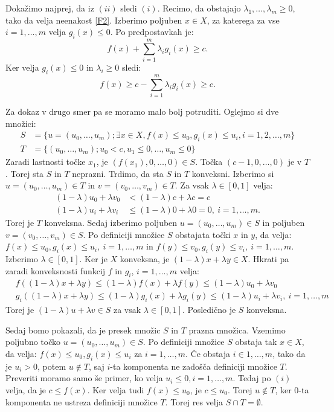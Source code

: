 \documentclass[mat1]{fmfdelo}
\begin{document}
\begin{dokaz}
	Dokažimo najprej, da iz $(ii)$ sledi $(i).$ Recimo, da obstajajo $\lambda_1, \ldots, \lambda_m \ge 0$, tako da velja neenakost \eqref{F2}. Izberimo poljuben $x \in X$, za katerega za vse $i = 1,\ldots, m$ velja $g_i(x) \le 0$. Po predpostavkah je: 
	$$ f(x) + \sum_{i=1}^{m}\lambda_ig_i(x) \ge c.$$ 
	Ker velja $g_i(x) \le 0$ in $\lambda_i \ge 0$ sledi: 
	$$ f(x) \ge c  - \sum_{i=1}^{m}\lambda_ig_i(x)\ge c. $$
	
	
	Za dokaz v drugo smer pa se moramo malo bolj potruditi.
	Oglejmo si dve množici: 
	\begin{align*}
	S &= \{u = (u_0,\ldots, u_m); \exists x \in X, f(x) \le u_0, g_i(x) \le u_i, i = 1,2, \ldots, m				\}\\ 
	T &= \{(u_0,\ldots, u_m); u_0 < c, u_1 \le 0, \ldots, u_m\le 0				\}     
	\end{align*}
	Zaradi lastnosti točke $x_1$, je $(f(x_1), 0, \ldots, 0) \in S$. Točka $(c-1, 0,\ldots ,0)$ je v $T$. Torej sta $S$ in $T$ neprazni. 
	Trdimo, da sta $S$ in $T$ konveksni. Izberimo si $u = (u_0, \ldots, u_m) \in T$ in $v = (v_0,  \ldots, v_m) \in T.$ Za vsak $\lambda \in [0,1]$ velja:
	\begin{align*}
	(1-\lambda)u_0 + \lambda v_0 &< 	(1-\lambda)c + \lambda c = c \\
	(1-\lambda)u_i + \lambda v_i &\le 	(1-\lambda)0 + \lambda 0 = 0, ~ i = 1, \ldots, m.
	\end{align*}
	Torej je $T$ konveksna. Sedaj izberimo poljuben $u = (u_0, \ldots, u_m) \in S$ in poljuben $v = (v_0,  \ldots, v_m) \in S.$ Po definiciji množice $S$ obstajata točki $x$ in $y$, da velja: $f(x) \le u_0, g_i(x) \le u_i, ~ i=1, \ldots, m$ in $f(y) \le v_0, g_i(y) \le v_i, ~ i=1, \ldots, m$. Izberimo $\lambda \in [0,1]$. Ker je $X$ konveksna, je $(1-\lambda)x + \lambda y \in X.$ Hkrati pa zaradi konveksnosti funkcij $f$ in $g_i$, $i=1,\ldots, m$ velja:
	\begin{align*}
	&f((1-\lambda)x + \lambda y) \le (1-\lambda)f(x) + \lambda f(y) \le 	 (1-\lambda)u_0 + \lambda v_0	\\
	&g_i((1-\lambda)x + \lambda y) \le (1-\lambda)g_i(x) + \lambda g_i(y) \le 	 (1-\lambda)u_i + \lambda v_i, ~i=1,\ldots,m	
	\end{align*}
	Torej je $(1-\lambda)u + \lambda v \in S$ za vsak $\lambda \in [0,1]$. Posledično je $S$ konveksna.
	
	
	Sedaj bomo pokazali, da je presek množic $S$ in $T$ prazna množica. Vzemimo poljubno točko $u=(u_0, \ldots, u_m) \in S$. Po definiciji množice $S$ obstaja tak $x \in X$, da velja: $f(x) \le u_0, g_i(x) \le u_i$ za $i=1,\ldots, m$. Če obstaja $i \in {1,\ldots, m}$, tako da je $u_i  > 0$, potem $u \notin T$, saj $i$-ta komponenta ne zadošča definiciji množice $T$. Preveriti moramo samo še primer, ko velja $u_i \le 0, i = 1, \ldots, m$. Tedaj po $(i)$ velja, da je $c \le f(x)$. Ker velja tudi $f(x) \le u_0$, je $c \le u_0$. Torej $u \notin T$, ker $0$-ta komponenta ne ustreza definiciji množice $T$. Torej res velja $S \cap T = \emptyset.$  
	

\end{dokaz}
\end{document}
